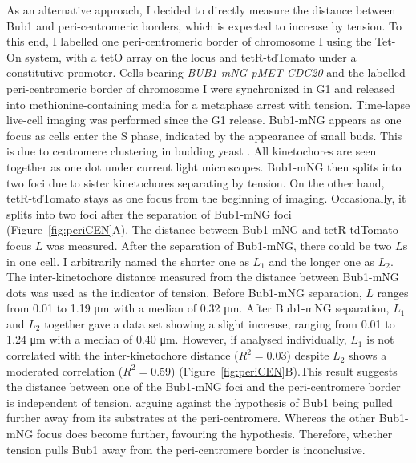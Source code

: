 As an alternative approach, I decided to directly measure the distance between Bub1 and peri-centromeric borders, which is expected to increase by tension. To this end, I labelled one peri-centromeric border of chromosome I using the Tet-On system, with a tetO array on the locus and tetR-tdTomato under a constitutive promoter. Cells bearing \textit{BUB1-mNG pMET-CDC20} and the labelled peri-centromeric border of chromosome I were synchronized in G1 and released into methionine-containing media for a metaphase arrest with tension. Time-lapse live-cell imaging was performed since the G1 release. Bub1-mNG appears as one focus as cells enter the S phase, indicated by the appearance of small buds. This is due to centromere clustering in budding yeast \citep{Taddei2012StructureNucleus}. All kinetochores  are seen together as one dot under current light microscopes. Bub1-mNG then splits into two foci due to sister kinetochores separating by tension. On the other hand, tetR-tdTomato stays as one focus from the beginning of imaging. Occasionally, it splits into two foci after the separation of Bub1-mNG foci (Figure~\ref{fig:periCEN}A). The distance between Bub1-mNG and tetR-tdTomato focus $L$ was measured. After the separation of Bub1-mNG, there could be two $L$s in one cell. I arbitrarily named the shorter one as $L_{1}$ and the longer one as $L_{2}$. The inter-kinetochore distance measured from the distance between Bub1-mNG dots was used as the indicator of tension. Before Bub1-mNG separation, $L$ ranges from 0.01 to 1.19 \si{\micro\metre} with a median of 0.32 \si{\micro\metre}. After Bub1-mNG separation, $L_{1}$ and $L_{2}$ together gave a data set showing a slight increase, ranging from 0.01 to 1.24 \si{\micro\metre} with a median of 0.40 \si{\micro\metre}. However, if analysed individually, $L_{1}$ is not correlated with the inter-kinetochore distance ($R^2 = 0.03$) despite $L_{2}$ shows a moderated correlation ($R^2 = 0.59$) (Figure~\ref{fig:periCEN}B).This result suggests the distance between one of the Bub1-mNG foci and the peri-centromere border is independent of tension, arguing against the hypothesis of Bub1 being pulled further away from its substrates at the peri-centromere. Whereas the other Bub1-mNG focus does become further, favouring the hypothesis. Therefore, whether tension pulls Bub1 away from the peri-centromere border is inconclusive. 


